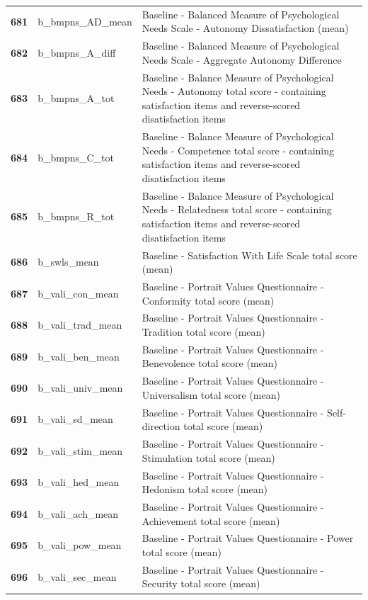 \documentclass[
  letterpaper,
  DIV=11,
  numbers=noendperiod]{scrartcl}
\begin{document}
\begin{longtable}[t]{>{}cll}
\addlinespace
\textbf{681} & b\_bmpns\_AD\_mean & Baseline - Balanced Measure of Psychological Needs Scale - Autonomy Dissatisfaction (mean)\\
\textbf{682} & b\_bmpns\_A\_diff & Baseline - Balanced Measure of Psychological Needs Scale - Aggregate Autonomy Difference\\
\textbf{683} & b\_bmpns\_A\_tot & Baseline - Balance Measure of Psychological Needs - Autonomy total score -  containing satisfaction items and reverse-scored disatisfaction items\\
\textbf{684} & b\_bmpns\_C\_tot & Baseline - Balance Measure of Psychological Needs - Competence total score -  containing satisfaction items and reverse-scored disatisfaction items\\
\textbf{685} & b\_bmpns\_R\_tot & Baseline - Balance Measure of Psychological Needs - Relatedness total score -  containing satisfaction items and reverse-scored disatisfaction items\\
\addlinespace
\textbf{686} & b\_swls\_mean & Baseline - Satisfaction With Life Scale total score (mean)\\
\textbf{687} & b\_vali\_con\_mean & Baseline - Portrait Values Questionnaire - Conformity total score (mean)\\
\textbf{688} & b\_vali\_trad\_mean & Baseline - Portrait Values Questionnaire - Tradition total score (mean)\\
\textbf{689} & b\_vali\_ben\_mean & Baseline - Portrait Values Questionnaire - Benevolence total score (mean)\\
\textbf{690} & b\_vali\_univ\_mean & Baseline - Portrait Values Questionnaire - Universalism total score (mean)\\
\addlinespace
\textbf{691} & b\_vali\_sd\_mean & Baseline - Portrait Values Questionnaire - Self-direction total score (mean)\\
\textbf{692} & b\_vali\_stim\_mean & Baseline - Portrait Values Questionnaire - Stimulation total score (mean)\\
\textbf{693} & b\_vali\_hed\_mean & Baseline - Portrait Values Questionnaire - Hedonism total score (mean)\\
\textbf{694} & b\_vali\_ach\_mean & Baseline - Portrait Values Questionnaire - Achievement total score (mean)\\
\textbf{695} & b\_vali\_pow\_mean & Baseline - Portrait Values Questionnaire - Power total score (mean)\\
\addlinespace
\textbf{696} & b\_vali\_sec\_mean & Baseline - Portrait Values Questionnaire - Security total score (mean)\\

\end{longtable}
\end{document}
